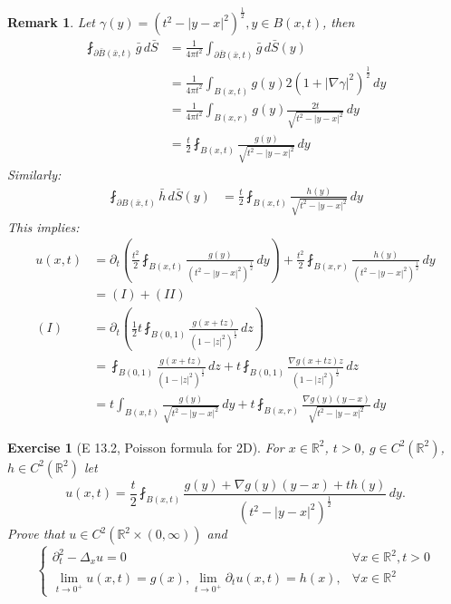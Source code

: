 \documentclass{report}
\theoremstyle{tommy}
\newtheorem{rem}[defn]{Remark}
\newtheorem{ex}[defn]{Exercise}
\begin{document}
  \begin{rem}\label{wave-2d-formula}
    Let \(\gamma(y) = (t^2 - |y-x|^2)^{\frac{1}{2}}, y \in B(x,t)\), then
    \begin{align*}
      \fint_{\partial \bar B(\bar x, t)} \bar g \, d\bar S &= \frac{1}{4 \pi t^2} \int_{\partial \bar B(\bar x, t)} \bar g \, d\bar S(y) \\
      &= \frac{1}{4 \pi t^2} \int_{B(x,t)} g(y) 2 (1 + |\nabla \gamma|^2)^{\frac{1}{2}} \, dy \\
      &= \frac{1}{4 \pi t^2} \int_{B(x,r)} g(y) \frac{2t}{\sqrt{t^2 - |y-x|^2}} \, dy \\
      &= \frac{t}{2} \fint_{B(x,t)} \frac{g(y)}{\sqrt{t^2 - |y-x|^2}} \, dy
    \end{align*}
    Similarly:
    \begin{align*}
      \fint_{\partial B(\bar x, t)} \bar h \, d\bar S(y) &= \frac{t}{2} \fint_{B(x,t)} \frac{h(y)}{\sqrt{t^2 - |y-x|^2}} \, dy
    \end{align*}
    This implies:
    \begin{align*}
      u(x,t) &= \partial_t \left(\frac{t^2}{2} \fint_{B(x,t)} \frac{g(y)}{(t^2-|y-x|^2)^{\frac{1}{2}}} \, dy\right) + \frac{t^2}{2} \fint_{B(x,r)} \frac{h(y)}{(t^2-|y-x|^2)^{\frac{1}{2}}} \, dy \\
      &= (I) + (II) \\
      (I) &= \partial_t \left(\frac{1}{2} t \fint_{B(0,1)} \frac{g(x+tz)}{(1-|z|^2)^{\frac{1}{2}}} \, dz\right) \\
      &= \fint_{B(0,1)} \frac{g(x+tz)}{(1-|z|^2)^{\frac{1}{2}}} \, dz + t \fint_{B(0,1)} \frac{\nabla g(x+tz) z}{(1-|z|^2)^{\frac{1}{2}}} \, dz \\
      &= t \int_{B(x,t)} \frac{g(y)}{\sqrt{t^2 - |y-x|^2}}\, dy + t \fint_{B(x,r)} \frac{\nabla g(y) (y-x)}{\sqrt{t^2 - |y-x|^2}} \, dy
    \end{align*}
  \end{rem}

  \begin{ex}[E 13.2, Poisson formula for 2D]
    For \(x \in \mathbb{R}^2\), \(t>0\), \(g \in C^2(\mathbb{R}^2)\), \(h \in C^2(\mathbb{R}^2)\) let
    \[u(x,t) = \frac{t}{2} \fint_{B(x,t)} \frac{g(y) + \nabla g(y)(y-x) + th(y)}{(t^2 - |y-x|^2)^{\frac{1}{2}}} \, dy.\]
    Prove that \(u \in C^2(\mathbb{R}^2 \times (0,\infty))\) and 
    \[\begin{cases}
      \partial_t^2 - \Delta_x u = 0 &\forall x \in \mathbb{R}^2, t > 0 \\
      \lim_{t \to 0^+} u(x,t) = g(x), \lim_{t \to 0^+} \partial_t u(x,t) = h(x), &\forall x \in \mathbb{R}^2
    \end{cases}\]
  \end{ex}
\end{document}
